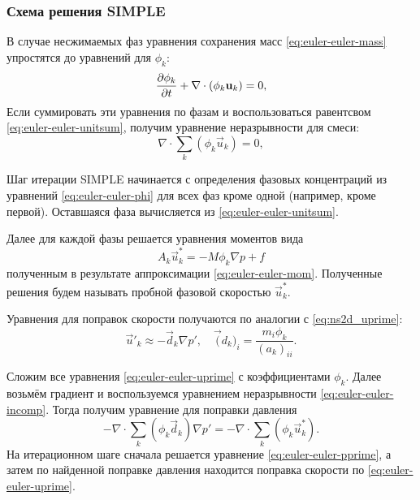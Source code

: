 \subsubsection{Схема решения SIMPLE}
\label{sec:euler-euler-simple}
В случае несжимаемых фаз уравнения сохранения масс \cref{eq:euler-euler-mass} упростятся
до уравнений для $\phi_k$:
\begin{equation}
\label{eq:euler-euler-phi}
\frac{\partial \phi_k}{\partial t} + \nabla\cdot\left(\phi_k \boldsymbol{\rm u}_k\right) = 0,
\end{equation}
Если суммировать эти уравнения по фазам и воспользоваться равентсвом \cref{eq:euler-euler-unitsum},
получим уравнение неразрывности для смеси:
\begin{equation}
\label{eq:euler-euler-incomp}
\nabla\cdot\sum_k\left(\phi_k \vec u_k\right) = 0,
\end{equation}

Шаг итерации SIMPLE начинается с определения
фазовых концентраций из уравнений \cref{eq:euler-euler-phi}
для всех фаз кроме одной (например, кроме первой).
Оставшаяся фаза вычисляется  из \cref{eq:euler-euler-unitsum}.

Далее для каждой фазы решается
уравнения моментов вида
\begin{equation}
A_k \vec u^*_k = -M \phi_k \nabla p + f
\end{equation}
полученным в результате аппроксимации \cref{eq:euler-euler-mom}.
Полученные решения будем называть пробной фазовой скоростью $\vec u^*_k$.

Уравнения для поправок скорости получаются по аналогии с \cref{eq:ns2d_uprime}:
\begin{equation}
\label{eq:euler-euler-uprime}
\vec u'_k \approx -\vec d_k \nabla p', \quad \vec (d_k)_i = \frac{m_i \phi_k}{(a_k)_{ii}}.
\end{equation}

Сложим все уравнения \cref{eq:euler-euler-uprime} с коэффициентами $\phi_k$.
Далее возьмём градиент и воспользуемся уравнением неразрывности \cref{eq:euler-euler-incomp}.
Тогда получим уравнение для поправки давления
\begin{equation}
\label{eq:euler-euler-pprime}
-\nabla\cdot \sum_k\left(\phi_k \vec d_k\right) \nabla p' = -\nabla\cdot\sum_k\left(\phi_k \vec u^*_k\right).
\end{equation}
На итерационном шаге сначала решается уравнение \cref{eq:euler-euler-pprime},
а затем по найденной поправке давления находится поправка скорости по \cref{eq:euler-euler-uprime}.
